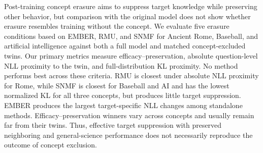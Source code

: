 Post-training concept erasure aims to suppress target knowledge while
preserving other behavior, but comparison with the original model does not
show whether erasure resembles training without the concept. We evaluate five
erasure conditions based on EMBER, RMU, and SNMF for Ancient Rome, Baseball, and
artificial intelligence against both a full model and matched concept-excluded
twins. Our primary metrics measure efficacy--preservation, absolute
question-level NLL proximity to the twin, and full-distribution KL proximity.
No method performs best across these criteria. RMU is closest under absolute NLL proximity
for Rome, while SNMF is closest for Baseball and AI and has the lowest
normalized KL for all three concepts, but produces little target suppression.
EMBER produces the largest target-specific NLL changes among standalone
methods. Efficacy--preservation winners vary across concepts and usually
remain far from their twins. Thus, effective target suppression with preserved
neighboring and general-science performance does not necessarily reproduce
the outcome of concept exclusion.
